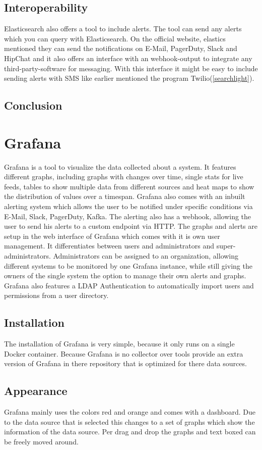 \subsection{Interoperability}
Elasticsearch also offers a tool to include alerts. The tool can send any alerts which you can query with Elasticsearch. On the official website, elastics mentioned they can send the notifications on E-Mail, PagerDuty, Slack and HipChat and it also offers an interface with an webhook-output to integrate any third-party-software for messaging. With this interface it might be easy to include sending alerts with SMS like earlier mentioned the program Twilio(\ref{searchlight}).
\subsection{Conclusion}


\section{Grafana}
\label{grafana} %
Grafana is a tool to visualize the data collected about a system. It features different graphs, including graphs with changes over time, single stats for live feeds, tables to show multiple data from different sources and heat maps to show the distribution of values over a timespan.
Grafana also comes with an inbuilt alerting system which allows the user to be notified under specific conditions via E-Mail, Slack, PagerDuty, Kafka. The alerting also has a webhook, allowing the user to send his alerts to a custom endpoint via HTTP.
The graphs and alerts are setup in the web interface of Grafana which comes with it is own user management. It differentiates between users and administrators and super-administrators. Administrators can be assigned to an organization, allowing different systems to be monitored by one Grafana instance, while still giving the owners of the single system the option to manage their own alerts and graphs.
Grafana also features a LDAP Authentication to automatically import users and permissions from a user directory.
\subsection{Installation}
The installation of Grafana is very simple, because it only runs on a single Docker container. Because Grafana is no collector over tools provide an extra version of Grafana in there repository that is optimized for there data sources.
\subsection{Appearance}%
Grafana mainly uses the colors red and orange and comes with a dashboard. Due to the data source that is selected this changes to a set of graphs which show the information of the data source. Per drag and drop the graphs and text boxed can be freely moved around. 
